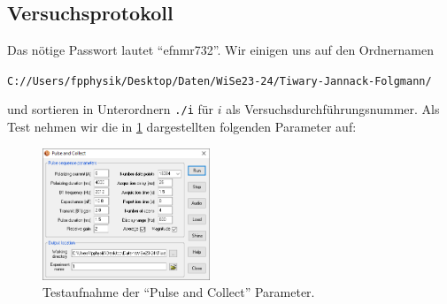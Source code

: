 \documentclass{subfiles}
\begin{document}
\subsection*{Versuchsprotokoll} 
Das nötige Passwort lautet \enquote{efnmr732}. Wir einigen uns auf den Ordnernamen 
\begin{center}
    \texttt{C://Users/fpphysik/Desktop/Daten/WiSe23-24/Tiwary-Jannack-Folgmann/}
\end{center}
und sortieren in Unterordnern \texttt{./i} für $i$ als Versuchsdurchführungsnummer. Als Test nehmen wir die in \ref{fig:TestPulseAndCollect} dargestellten folgenden Parameter auf:
\begin{figure}[H]
    \centering
    \includegraphics[width=5cm]{Live-Dokumente/Bilder/Testaufnahme-Pulse-And-Collect.PNG}
    \caption{Testaufnahme der \enquote{Pulse and Collect} Parameter.}
    \label{fig:TestPulseAndCollect}
\end{figure}
\end{document}
